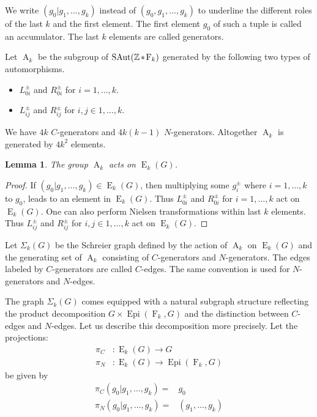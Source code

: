 \documentclass[12pt]{amsart}
\newtheorem{lemma}[theorem]{Lemma}
\theoremstyle{definition}
\numberwithin{figure}{section}
\numberwithin{table}{section}
\numberwithin{equation}{section}
\newcommand{\OP}[1]{\operatorname{#1}}
\newcommand{\SAut}{\operatorname{SAut}}
\newcommand{\Epi}{\operatorname{Epi}}
\newcommand{\F}{\operatorname{F}}
\newcommand{\A}{\operatorname{A}}
\newcommand{\E}{\operatorname{E}}
\newcommand{\myast}{\hspace{-1pt} \ast \hspace{-1pt}}
\newcommand{\FP}{\mathbb{Z} \myast \F_k}
\begin{document}
We write $(g_0 | g_1, \ldots,g_k)$ instead of $(g_0, g_1,\ldots,g_k)$ to underline the different roles of the last $k$ and the first element. The first element $g_0$ of such a tuple is called an accumulator. The last $k$ elements are called generators.

Let \marginnote{$\OP A_k$} $\OP A_k$ be the subgroup of $\SAut(\FP)$ generated by the following two types of automorphisms.

\begin{itemize}[itemindent=4em]
\item[\textbf{$C$-generators:}] $L^{\pm}_{\mathrm{0}i}$ and $R^{\pm}_{\mathrm{0}i}$ for $i=1,\ldots,k$.
\item[\textbf{$N$-generators:}] $L^{\pm}_{ij}$ and $R^{\pm}_{ij}$ for $i,j \in 1,\ldots,k$.
\end{itemize}

We have $4k$ $C$-generators and $4k(k-1)$ $N$-generators. Altogether $\A_k$ is generated by $4k^2$ elements. 

\begin{lemma}
The group $\A_k$ acts on $\E_k(G)$.
\end{lemma}
\begin{proof}
If $(g_0 | g_1,\ldots,g_k) \in \E_k(G)$, then multiplying some $g_i^{\pm}$ where $i=1,\ldots,k$ to $g_0$, leads to an element in $\E_k(G)$. Thus $L^{\pm}_{0i}$ and $R^{\pm}_{0i}$ for $i=1,\ldots,k$ act on $\E_k(G)$. 
One can also perform Nielsen transformations within last $k$ elements. Thus $L^{\pm}_{ij}$ and $R^{\pm}_{ij}$ for $i,j \in 1,\ldots,k$ act on $\E_k(G)$. 
\end{proof}

Let  $\Sigma_k(G)$ be the Schreier graph defined by the action of $\A_k$ on $\E_k(G)$ and the generating set of $\A_k$ consisting of $C$-generators and $N$-generators. 
The edges labeled by $C$-generators are called $C$-edges. The same convention is used for $N$-generators and $N$-edges. 

The graph $\Sigma_k(G)$ comes equipped with a natural subgraph structure reflecting the product decomposition $G \times \Epi(\F_k,G)$ and the distinction between $C$-edges and $N$-edges. Let us describe this decomposition more precisely. Let the projections:
\begin{align*}
\pi_C &\colon \E_k(G) \to G\\
\pi_N &\colon \E_k(G) \to \Epi(\F_k,G)
\end{align*}
be given by 
\begin{align*} 
\pi_C(g_0 | g_1,\ldots,g_k) = & g_0\\
\pi_N(g_0 | g_1,\ldots,g_k) = & (g_1,\ldots,g_k)
\end{align*}
\end{document}
